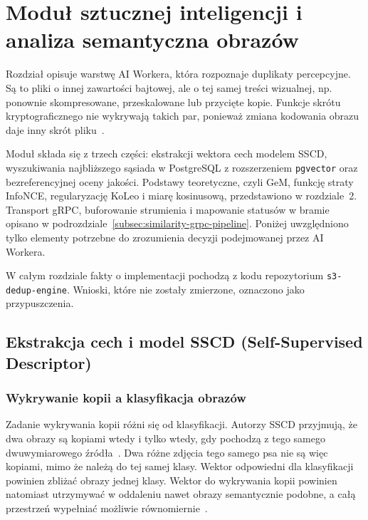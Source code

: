 \clearpage %
\section{Moduł sztucznej inteligencji i analiza semantyczna obrazów}

Rozdział opisuje warstwę AI Workera, która rozpoznaje duplikaty
percepcyjne. Są to pliki o innej zawartości bajtowej, ale o tej samej
treści wizualnej, np. ponownie skompresowane, przeskalowane lub
przycięte kopie. Funkcje skrótu kryptograficznego nie wykrywają takich
par, ponieważ zmiana kodowania obrazu daje inny skrót
pliku~\cite{pizzi2022sscd}.

Moduł składa się z trzech części: ekstrakcji wektora cech modelem SSCD,
wyszukiwania najbliższego sąsiada w PostgreSQL z rozszerzeniem
\texttt{pgvector} oraz bezreferencyjnej oceny jakości. Podstawy
teoretyczne, czyli GeM, funkcję straty InfoNCE, regularyzację KoLeo
i miarę kosinusową, przedstawiono w rozdziale~2. Transport gRPC,
buforowanie strumienia i mapowanie statusów w bramie opisano
w podrozdziale~\ref{subsec:similarity-grpc-pipeline}. Poniżej
uwzględniono tylko elementy potrzebne do zrozumienia decyzji
podejmowanej przez AI Workera.

W całym rozdziale fakty o implementacji pochodzą z kodu repozytorium
\texttt{s3-dedup-engine}. Wnioski, które nie zostały zmierzone,
oznaczono jako przypuszczenia.

\subsection{Ekstrakcja cech i model SSCD (Self-Supervised Descriptor)}
\label{sec:model-sscd}

\subsubsection{Wykrywanie kopii a klasyfikacja obrazów}

Zadanie wykrywania kopii różni się od klasyfikacji. Autorzy SSCD
przyjmują, że dwa obrazy są kopiami wtedy i tylko wtedy, gdy pochodzą
z tego samego dwuwymiarowego źródła~\cite{pizzi2022sscd}.
Dwa różne zdjęcia tego samego psa nie są więc kopiami, mimo że należą
do tej samej klasy. Wektor odpowiedni dla klasyfikacji powinien
zbliżać obrazy jednej klasy. Wektor do wykrywania kopii powinien
natomiast utrzymywać w oddaleniu nawet obrazy semantycznie podobne,
a całą przestrzeń wypełniać możliwie równomiernie~\cite{pizzi2022sscd}.

